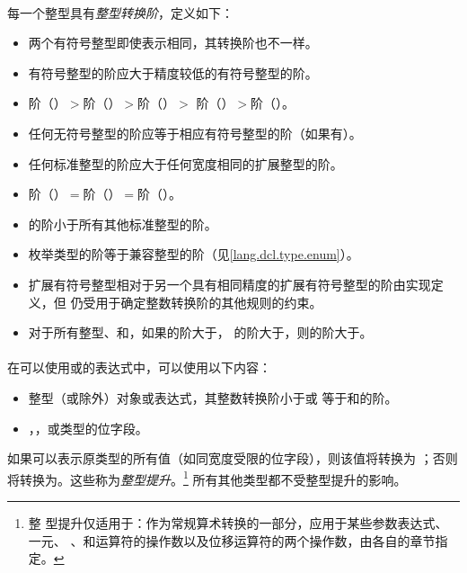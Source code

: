 {\paragraph{}
每一个整型具有\textit{整型转换阶}，定义如下：
\begin{itemize}
  \item{两个有符号整型即使表示相同，其转换阶也不一样。}
  \item{有符号整型的阶应大于精度较低的有符号整型的阶。}
  \item{阶（）$>$阶（）$>$阶（）$>$
    阶（）$>$阶（）。}
  \item{任何无符号整型的阶应等于相应有符号整型的阶（如果有）。}
  \item{任何标准整型的阶应大于任何宽度相同的扩展整型的阶。}
  \item{阶（）$=$阶（）$=$阶（）。}
  \item{的阶小于所有其他标准整型的阶。}
  \item{枚举类型的阶等于兼容整型的阶（见\ref{lang.dcl.type.enum}）。}
  \item{扩展有符号整型相对于另一个具有相同精度的扩展有符号整型的阶由实现定义，但
    仍受用于确定整数转换阶的其他规则的约束。}
  \item{对于所有整型、和，如果的阶大于，
    的阶大于，则的阶大于。}
\end{itemize}

\paragraph{}
在可以使用或的表达式中，可以使用以下内容：
\begin{itemize}
  \item{整型（或除外）对象或表达式，其整数转换阶小于或
    等于和的阶。}
  \item{，，或类型的位字段。}
\end{itemize}
如果可以表示原类型的所有值（如同宽度受限的位字段），则该值将转换为
；否则将转换为。这些称为\textit{整型提升}。\footnote{整
型提升仅适用于：作为常规算术转换的一部分，应用于某些参数表达式、一元\tm{+}、
\tm{-}、和\tm{\~}运算符的操作数以及位移运算符的两个操作数，由各自的章节指定。}
所有其他类型都不受整型提升的影响。

}
